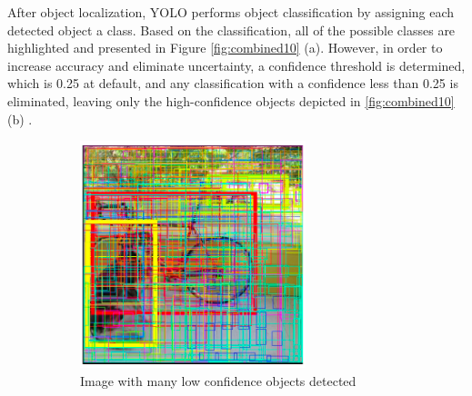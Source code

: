 \documentclass[conference]{IEEEtran}
\begin{document}
After object localization, YOLO performs object classification by assigning each detected object a class. Based on the classification, all of the possible classes are highlighted and presented in Figure \ref{fig:combined10} (a). However, in order to increase accuracy and eliminate uncertainty, a confidence threshold is determined, which is 0.25 at default, and any classification with a confidence less than 0.25 is eliminated, leaving only the high-confidence objects depicted in \ref{fig:combined10} (b) \cite{b24}. 

\begin{figure}[ht]
  \centering
  \begin{subfigure}[b]{0.45\linewidth}
    \includegraphics[width=\linewidth]{images/Picture37.png}
    \caption{Image with many low confidence objects detected}
  \end{subfigure}
  \begin{subfigure}[b]{0.45\linewidth}

\end{subfigure}
\end{figure}
\end{document}

